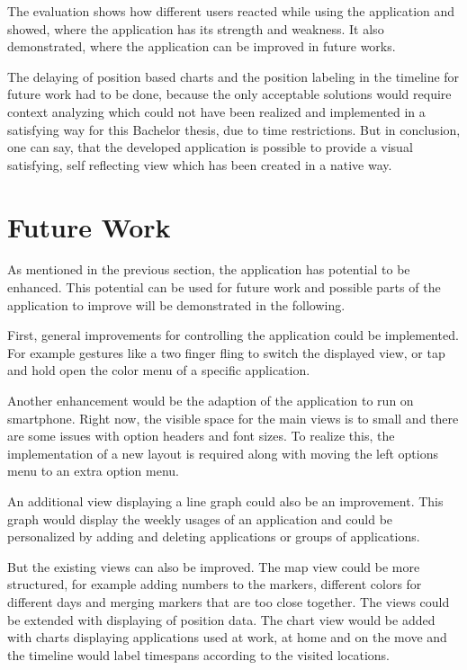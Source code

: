 The evaluation shows how different users reacted while using the application and showed, where the application has its strength and weakness. It also demonstrated, where the application can be improved in future works.

The  delaying of position based charts and the position labeling in the timeline for future work had to be done, because the only acceptable solutions would require context analyzing which could not have been realized and implemented in a satisfying way for this Bachelor thesis, due to time restrictions. But in conclusion, one can say, that the developed application is possible to provide a visual satisfying, self reflecting view which has been created in a native way.

\section{Future Work}
As mentioned in the previous section, the application has potential to be enhanced. This potential can be used for future work and possible parts of the application to improve will be demonstrated in the following.

First,  general improvements for controlling the application could be implemented. For example gestures like a two finger fling to switch the displayed view, or tap and hold open the color menu of a specific application.

Another enhancement would be the adaption of the application to run on smartphone. Right now, the visible space for the main views is to small and there are some issues with option headers and font sizes. To realize this, the implementation of a new layout is required along with moving the left options menu to an extra option menu.

An additional view displaying a line graph could also be an improvement. This graph would display the weekly usages of an application and could be personalized by adding and deleting applications or groups of applications.

But  the existing views can also be improved. The map view could be more structured, for example adding numbers to the markers, different colors for different days and merging markers that are too close together. The views could be extended with displaying of position data. The chart view would be added with charts displaying applications used at work, at home and on the move and the timeline would label timespans according to the visited locations. 

